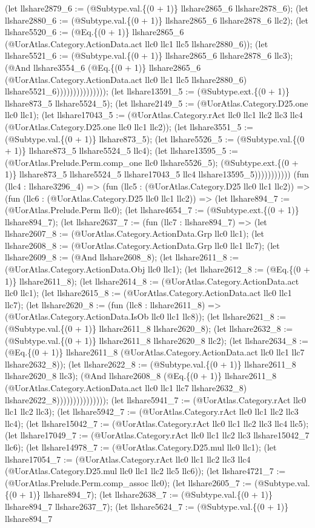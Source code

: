 \documentclass[11pt]{article}
\begin{document}
(let llshare2879\_6 := (@Subtype.val.\{(0 + 1)\} llshare2865\_6 llshare2878\_6); (let llshare2880\_6 := (@Subtype.val.\{(0 + 1)\} llshare2865\_6 llshare2878\_6 llc2); (let llshare5520\_6 := (@Eq.\{(0 + 1)\} llshare2865\_6 (@UorAtlas.Category.ActionData.act llc0 llc1 llc5 llshare2880\_6)); (let llshare5521\_6 := (@Subtype.val.\{(0 + 1)\} llshare2865\_6 llshare2878\_6 llc3); (@And llshare3554\_6 (@Eq.\{(0 + 1)\} llshare2865\_6 (@UorAtlas.Category.ActionData.act llc0 llc1 llc5 llshare2880\_6) llshare5521\_6))))))))))))))); (let llshare13591\_5 := (@Subtype.ext.\{(0 + 1)\} llshare873\_5 llshare5524\_5); (let llshare2149\_5 := (@UorAtlas.Category.D25.one llc0 llc1); (let llshare17043\_5 := (@UorAtlas.Category.rAct llc0 llc1 llc2 llc3 llc4 (@UorAtlas.Category.D25.one llc0 llc1 llc2)); (let llshare3551\_5 := (@Subtype.val.\{(0 + 1)\} llshare873\_5); (let llshare5526\_5 := (@Subtype.val.\{(0 + 1)\} llshare873\_5 llshare5524\_5 llc4); (let llshare13595\_5 := (@UorAtlas.Prelude.Perm.comp\_one llc0 llshare5526\_5); (@Subtype.ext.\{(0 + 1)\} llshare873\_5 llshare5524\_5 llshare17043\_5 llc4 llshare13595\_5))))))))))) (fun (llc4 : llshare3296\_4) => (fun (llc5 : (@UorAtlas.Category.D25 llc0 llc1 llc2)) => (fun (llc6 : (@UorAtlas.Category.D25 llc0 llc1 llc2)) => (let llshare894\_7 := (@UorAtlas.Prelude.Perm llc0); (let llshare4654\_7 := (@Subtype.ext.\{(0 + 1)\} llshare894\_7); (let llshare2637\_7 := (fun (llc7 : llshare894\_7) => (let llshare2607\_8 := (@UorAtlas.Category.ActionData.Grp llc0 llc1); (let llshare2608\_8 := (@UorAtlas.Category.ActionData.Grp llc0 llc1 llc7); (let llshare2609\_8 := (@And llshare2608\_8); (let llshare2611\_8 := (@UorAtlas.Category.ActionData.Obj llc0 llc1); (let llshare2612\_8 := (@Eq.\{(0 + 1)\} llshare2611\_8); (let llshare2614\_8 := (@UorAtlas.Category.ActionData.act llc0 llc1); (let llshare2615\_8 := (@UorAtlas.Category.ActionData.act llc0 llc1 llc7); (let llshare2620\_8 := (fun (llc8 : llshare2611\_8) => (@UorAtlas.Category.ActionData.IsOb llc0 llc1 llc8)); (let llshare2621\_8 := (@Subtype.val.\{(0 + 1)\} llshare2611\_8 llshare2620\_8); (let llshare2632\_8 := (@Subtype.val.\{(0 + 1)\} llshare2611\_8 llshare2620\_8 llc2); (let llshare2634\_8 := (@Eq.\{(0 + 1)\} llshare2611\_8 (@UorAtlas.Category.ActionData.act llc0 llc1 llc7 llshare2632\_8)); (let llshare2622\_8 := (@Subtype.val.\{(0 + 1)\} llshare2611\_8 llshare2620\_8 llc3); (@And llshare2608\_8 (@Eq.\{(0 + 1)\} llshare2611\_8 (@UorAtlas.Category.ActionData.act llc0 llc1 llc7 llshare2632\_8) llshare2622\_8))))))))))))))); (let llshare5941\_7 := (@UorAtlas.Category.rAct llc0 llc1 llc2 llc3); (let llshare5942\_7 := (@UorAtlas.Category.rAct llc0 llc1 llc2 llc3 llc4); (let llshare15042\_7 := (@UorAtlas.Category.rAct llc0 llc1 llc2 llc3 llc4 llc5); (let llshare17049\_7 := (@UorAtlas.Category.rAct llc0 llc1 llc2 llc3 llshare15042\_7 llc6); (let llshare14978\_7 := (@UorAtlas.Category.D25.mul llc0 llc1); (let llshare17054\_7 := (@UorAtlas.Category.rAct llc0 llc1 llc2 llc3 llc4 (@UorAtlas.Category.D25.mul llc0 llc1 llc2 llc5 llc6)); (let llshare4721\_7 := (@UorAtlas.Prelude.Perm.comp\_assoc llc0); (let llshare2605\_7 := (@Subtype.val.\{(0 + 1)\} llshare894\_7); (let llshare2638\_7 := (@Subtype.val.\{(0 + 1)\} llshare894\_7 llshare2637\_7); (let llshare5624\_7 := (@Subtype.val.\{(0 + 1)\} llshare894\_7 
\end{document}
